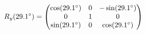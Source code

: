 \documentclass[preview]{standalone}
\begin{document}
\begin{align*}
\special{dvisvgm:raw <g id='unique000'>}R_y(29.1^\circ) = \begin{pmatrix} \cos(29.1^\circ) & 0 & -\sin(29.1^\circ) \\ 0 & 1 & 0 \\ \sin(29.1^\circ) & 0 & \cos(29.1^\circ) \end{pmatrix}\special{dvisvgm:raw </g>}
\end{align*}
\end{document}
